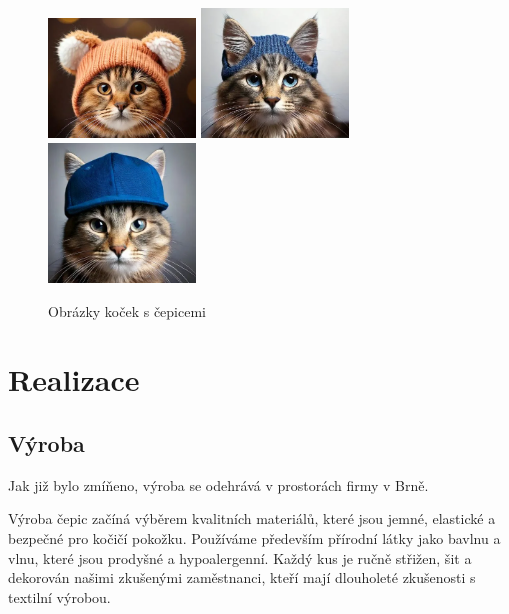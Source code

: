 \documentclass[12pt, a4paper]{article}
\begin{document}
\begin{figure}[h!]
  \centering
  \includegraphics[width=0.35\textwidth, height=0.3\textwidth]{files/kocka1.png}
  \hspace{0.5cm}
  \vspace{0.5cm}
  \includegraphics[width=0.35\textwidth, height=0.3\textwidth]{files/kocka2.png}
  \hspace{0.5cm}
  \includegraphics[width=0.35\textwidth, height=0.3\textwidth]{files/kocka3.png}
  \caption{Obrázky koček s čepicemi}
\end{figure}

\section{Realizace}
\subsection{Výroba}

Jak již bylo zmíňeno, výroba se odehrává v prostorách firmy v Brně. 
\vspace{10pt}

\noindent Výroba čepic začíná výběrem kvalitních materiálů, které jsou jemné, elastické a bezpečné pro kočičí pokožku.
Používáme především přírodní látky jako bavlnu a vlnu, které jsou prodyšné a hypoalergenní.
Každý kus je ručně střižen, šit a dekorován našimi zkušenými zaměstnanci, kteří mají dlouholeté zkušenosti s textilní výrobou.
\end{document}
